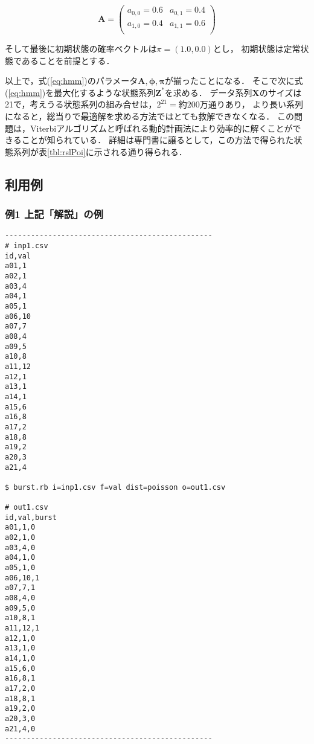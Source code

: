 \begin{equation}
\mathbf{A}=\left(
\begin{array}{cc}
a_{0,0}=0.6 &a_{0,1}=0.4 \\
a_{1,0}=0.4 &a_{1,1}=0.6 \\
\end{array}
\right)
\label{eq:transMatrix}
\end{equation}

そして最後に初期状態の確率ベクトルは$\pi=(1.0,0.0)$とし，
初期状態は定常状態であることを前提とする．

以上で，式(\ref{eq:hmm})のパラメータ$\mathbf{A},\boldsymbol{\phi},\boldsymbol{\pi}$が揃ったことになる．
そこで次に式(\ref{eq:hmm})を最大化するような状態系列$\mathbf{Z}^*$を求める．
データ系列$\mathbf{X}$のサイズは21で，考えうる状態系列の組み合せは，$2^{21}=約200万$通りあり，
より長い系列になると，総当りで最適解を求める方法ではとても救解できなくなる．
この問題は，Viterbiアルゴリズムと呼ばれる動的計画法により効率的に解くことができることが知られている．
詳細は専門書に譲るとして，この方法で得られた状態系列が表\ref{tbl:rslPoi}に示される通り得られる．

\subsection{利用例}
\subsubsection{例1 上記「解説」の例}

\begin{verbatim}
------------------------------------------------
# inp1.csv
id,val
a01,1
a02,1
a03,4
a04,1
a05,1
a06,10
a07,7
a08,4
a09,5
a10,8
a11,12
a12,1
a13,1
a14,1
a15,6
a16,8
a17,2
a18,8
a19,2
a20,3
a21,4

$ burst.rb i=inp1.csv f=val dist=poisson o=out1.csv

# out1.csv
id,val,burst
a01,1,0
a02,1,0
a03,4,0
a04,1,0
a05,1,0
a06,10,1
a07,7,1
a08,4,0
a09,5,0
a10,8,1
a11,12,1
a12,1,0
a13,1,0
a14,1,0
a15,6,0
a16,8,1
a17,2,0
a18,8,1
a19,2,0
a20,3,0
a21,4,0
------------------------------------------------
\end{verbatim}


%

